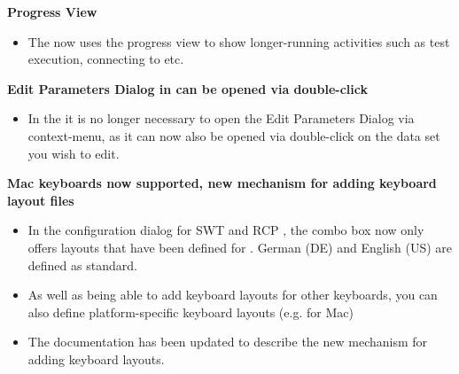 \textbf{Progress View}
\begin{itemize}
\item The \ite{} now  uses the progress view to show longer-running activities such as test execution, connecting to \gdauts{} etc.
\end{itemize}

\textbf{Edit Parameters Dialog in \gddataeditor{} can be opened via double-click}
\begin{itemize}
\item In the \gddataeditor{}  it is no longer necessary to open the Edit Parameters Dialog via context-menu, as it can now also be opened via double-click on the data set you wish to edit.
\end{itemize}


\textbf{Mac keyboards now supported, new mechanism for adding keyboard layout files}
\begin{itemize}
\item In the \gdaut{} configuration dialog for SWT and RCP \gdauts{}, the  combo box now only offers 
layouts that have been defined for \app{}. German (DE) and English (US) are defined as standard. 
\item As well as being able to add keyboard layouts for other keyboards, you can also define platform-specific keyboard layouts (e.g. for Mac)
\item The documentation has been updated to describe the new mechanism for adding keyboard layouts.
\end{itemize}

